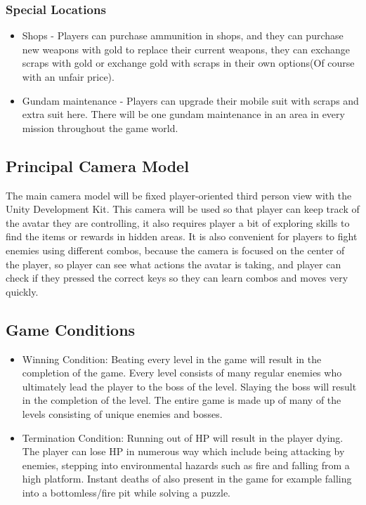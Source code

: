 \documentclass{article}
\begin{document}
    \subsubsection*{Special Locations}
    \begin{itemize}
        \item Shops - Players can purchase ammunition in shops, and they can purchase new weapons with gold to replace their current weapons, they can exchange scraps with gold or exchange gold with scraps in their own options(Of course with an unfair price).
        \item Gundam maintenance - Players can upgrade their mobile suit with scraps and extra suit here. There will be one gundam maintenance in an area in every mission throughout the game world.
    \end{itemize}
    
\subsection*{Principal Camera Model}
The main camera model will be fixed player-oriented third person view with the Unity Development Kit. This camera will be used so that player can keep track of the avatar they are controlling, it also requires player a bit of exploring skills to find the items or rewards in hidden areas. It is also convenient for players to fight enemies using different combos, because the camera is focused on the center of the player, so player can see what actions the avatar is taking, and player can check if they pressed the correct keys so they can learn combos and moves very quickly.

\subsection*{Game Conditions}
    \begin{itemize}
        \item Winning Condition: Beating every level in the game will result in the completion of the game.
        Every level consists of many regular enemies who ultimately lead the player to the boss of the level. Slaying the boss will result in the completion of the level. The entire game is made up of many of the levels consisting of unique enemies and bosses.
        \item Termination Condition: Running out of HP will result in the player dying. 
        The player can lose HP in numerous way which include being attacking by enemies, stepping into environmental hazards such as fire and falling from a high platform. Instant deaths of also present in the game for example falling into a bottomless/fire pit while solving a puzzle.
    \end{itemize}
\end{document}
